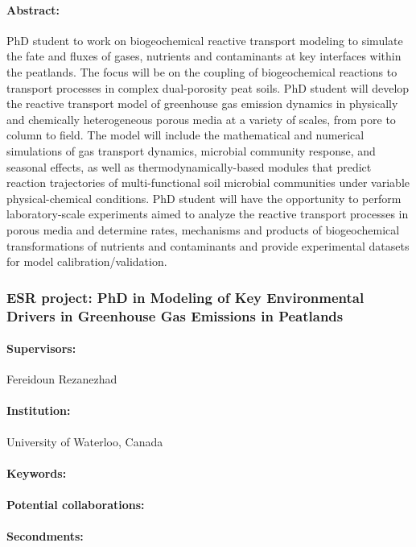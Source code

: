 \documentclass[12pt]{article}
\begin{document}
\paragraph{Abstract:} PhD student to work on biogeochemical reactive transport modeling to simulate the fate and fluxes of gases, nutrients and contaminants at key interfaces within the peatlands. The focus will be on the coupling of biogeochemical reactions to transport processes in complex dual-porosity peat soils. PhD student will develop the reactive transport model of greenhouse gas emission dynamics in physically and chemically heterogeneous porous media at a variety of scales, from pore to column to field. The model will include the mathematical and numerical simulations of gas transport dynamics, microbial community response, and seasonal effects, as well as thermodynamically-based modules that predict reaction trajectories of multi-functional soil microbial communities under variable physical-chemical conditions. PhD student will have the opportunity to perform laboratory-scale experiments aimed to analyze the reactive transport processes in porous media and determine rates, mechanisms and products of biogeochemical transformations of nutrients and contaminants and provide experimental datasets for model calibration/validation. 

\subsubsection*{ESR project: PhD in Modeling of Key Environmental Drivers in Greenhouse Gas Emissions in Peatlands}
\paragraph{Supervisors:} Fereidoun Rezanezhad
\paragraph{Institution:} University of Waterloo, Canada
\paragraph{Keywords:} 
\paragraph{Potential collaborations:} 
\paragraph{Secondments:} 
\end{document}
